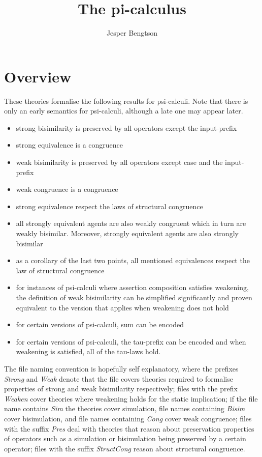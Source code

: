 \documentclass[11pt,a4paper]{article}
\begin{document}
\title{The pi-calculus}
\author{Jesper Bengtson}
\maketitle

\begin{abstract}

\end{abstract}

\tableofcontents

\section{Overview}

These theories formalise the following results for psi-calculi. Note
that there is only an early semantics for psi-calculi, although a late
one may appear later. 

\begin{itemize}
\item strong bisimilarity is preserved by all operators except the
  input-prefix 
\item strong equivalence is a congruence
\item weak bisimilarity is preserved by all operators except case and the
  input-prefix 
\item weak congruence is a congruence
\item strong equivalence respect the laws of structural congruence
\item all strongly equivalent agents are also weakly congruent which in
  turn are weakly bisimilar. Moreover, strongly equivalent agents are
  also strongly bisimilar 
\item as a corollary of the last two points, all mentioned equivalences
  respect the law of structural congruence 
\item for instances of psi-calculi where assertion composition satisfies
  weakening, the definition of weak bisimilarity can be simplified
  significantly and proven equivalent to the version that applies when
  weakening does not hold 
\item for certain versions of psi-calculi, sum can be encoded
\item for certain versions of psi-calculi, the tau-prefix can be encoded
  and when weakening is satisfied, all of the tau-laws hold. 
\end{itemize}

The file naming convention is hopefully self explanatory, where the
prefixes \emph{Strong} and \emph{Weak} denote that the file covers theories
required to formalise properties of strong and weak bisimilarity
respectively; files with the prefix \emph{Weaken} cover theories where
weakening holds for the static implication; if the file name contains
\emph{Sim} the theories cover simulation, file names containing \emph{Bisim}
cover bisimulation, and file names containing \emph{Cong} cover weak
congruence; files with the suffix \emph{Pres} deal with theories that
reason about preservation properties of operators such as a simulation
or bisimulation being preserved by a certain operator; files with the
suffix \emph{StructCong} reason about structural congruence.
\end{document}

